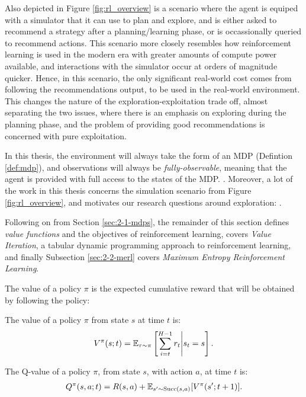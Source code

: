    Also depicted in Figure \ref{fig:rl_overview} is a scenario where the agent is equiped with a simulator that it can use to plan and explore, and is either asked to recommend a strategy after a planning/learning phase, or is occassionally queried to recommend actions. This scenario more closely resembles how reinforcement learning is used in the modern era with greater amounts of compute power available, and interactions with the simulator occur at orders of magnitude quicker. Hence, in this scenario, the only significant real-world cost comes from following the recommendations output, to be used in the real-world environment. This changes the nature of the exploration-exploitation trade off, almost separating the two issues, where there is an emphasis on exploring during the planning phase, and the problem of providing good recommendations is concerned with pure exploitation. 

    In this thesis, the environment will always take the form of an MDP (Defintion \ref{def:mdp}), and observations will always be \textit{fully-observable}, meaning that the agent is provided with full access to the states of the MDP. . Moreover, a lot of the work in this thesis concerns the simulation scenario from Figure \ref{fig:rl_overview}, and motivates our research questions around exploration: \exploreq.

    Following on from Section \ref{sec:2-1-mdps}, the remainder of this section defines \textit{value functions} and the objectives of reinforcement learning, covers \textit{Value Iteration}, a tabular dynamic programming approach to reinforcement learning, and finally Subsection \ref{sec:2-2-merl} covers \textit{Maximum Entropy Reinforcement Learning}.
    
    The value of a policy $\pi$ is the expected cumulative reward that will be obtained by following the policy:
    \begin{defn}
        \label{def:value}
        \label{def:q_value}
        The \textnormal{value} of a policy $\pi$ from state $s$ at time $t$ is:
        \begin{align}
            V^{\pi}(s;t) = \mathbb{E}_{\tau\sim\pi}\left[\sum_{i=t}^{H-1} r_t \Bigg| s_t=s \right].
        \end{align} 

        The \textnormal{Q-value} of a policy $\pi$, from state $s$, with action $a$, at time $t$ is:
        \begin{align}
            Q^{\pi}(s,a;t) = R(s,a) + \mathbb{E}_{s'\sim {\textnormal{Succ}(s,a)}} [V^{\pi}(s';t+1)].
        \end{align} 
    \end{defn}





